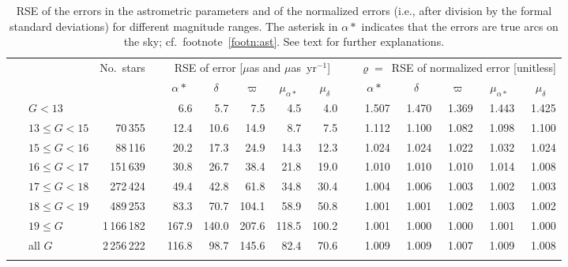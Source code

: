 \documentclass[structabstract]{aa}
\begin{document}
\begin{table}
\caption{RSE of the errors in the astrometric parameters and of the normalized errors (i.e., after division by the formal standard deviations) for different magnitude ranges. The asterisk in $\alpha *$ indicates that the errors are true arcs on the sky; cf.\ footnote~\ref{footn:ast}. See text for further explanations.\label{tab:res:varpistats}}
\centering
\begin{tabular}{lrrrrrrrrrrrrr}
\hline\hline
\noalign{\smallskip}
\multirow{3}{*}{Magnitude range} & \multirow{3}{*}{No.~stars} && \multicolumn{5}{c}{RSE of error [$\mu$as and $\mu$as~yr$^{-1}$]} && \multicolumn{5}{c}{ $\varrho=$~RSE of normalized error [unitless]}\\
\noalign{\smallskip}
\cline{4-8}  \cline{10-14}
\noalign{\smallskip}
& && \multicolumn{1}{c}{$\alpha*$} & \multicolumn{1}{c}{$\delta$} & \multicolumn{1}{c}{$\varpi$} & \multicolumn{1}{c}{$\mu_{\alpha *}$} & \multicolumn{1}{c}{$\mu_{\delta}$} && \multicolumn{1}{c}{$\alpha *$} & \multicolumn{1}{c}{$\delta$} & \multicolumn{1}{c}{$\varpi$} & \multicolumn{1}{c}{$\mu_{\alpha*}$} & \multicolumn{1}{c}{$\mu_{\delta}$}\\
\noalign{\smallskip}
\hline
\noalign{\smallskip}
~~~\hspace{2.2em}$G<13$ & 18\,253 && 6.6 & 5.7 & 7.5 & 4.5 & 4.0 && 1.507 & 1.470 & 1.369 & 1.443 & 1.425 \\
~~~$13\le G<15$ & 70\,355 && 12.4 & 10.6 & 14.9 & 8.7 & 7.5 && 1.112 & 1.100 & 1.082 & 1.098 & 1.100 \\
~~~$15\le G<16$ & 88\,116 && 20.2 & 17.3 & 24.9 & 14.3 & 12.3 && 1.024 & 1.024 & 1.022 & 1.032 & 1.024 \\
~~~$16\le G<17$ & 151\,639 && 30.8 & 26.7 & 38.4 & 21.8 & 19.0 && 1.010 & 1.010 & 1.010 & 1.014 & 1.008 \\
~~~$17\le G<18$ & 272\,424 && 49.4 & 42.8 & 61.8 & 34.8 & 30.4 && 1.004 & 1.006 & 1.003 & 1.002 & 1.003 \\
~~~$18\le G<19$ & 489\,253 && 83.3 & 70.7 & 104.1 & 58.9 & 50.8 && 1.001 & 1.001 & 1.002 & 1.003 & 1.002 \\
~~~$19 \le G$ & 1\,166\,182 && 167.9 & 140.0 & 207.6 & 118.5 & 100.2 && 1.001 & 1.000 & 1.000 & 1.001 & 1.000 \\
\noalign{\smallskip}
\hline
\noalign{\smallskip}
~~~all $G$ & 2\,256\,222 && 116.8 & 98.7 & 145.6 & 82.4 & 70.6 && 1.009 & 1.009 & 1.007 & 1.009 & 1.008 \\
\noalign{\smallskip}
\hline
\end{tabular}
\end{table}
\end{document}

